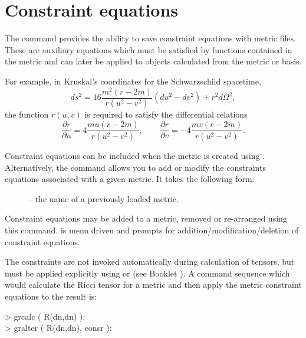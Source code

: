 \documentclass{article}
\begin{document}
\section{Constraint equations} \label{sec:constraint}
%
The  command provides the ability to save constraint equations
with metric files. These are auxiliary equations which must be satisfied
by functions contained in the metric and can later be applied to objects
calculated from the metric or basis.

For example, in Kruskal's coordinates for the Schwarzschild spacetime,
\[
  ds^2 = 16 \frac{m^2(r-2m)}{r(u^2-v^2)}(du^2 - dv^2) + r^2 d\Omega^2,
\]
the function $r(u,v)$ is required to satisfy the differential relations
\[
  \frac{\partial r}{\partial u} = 4 \frac{m u (r-2m)}{r(u^2 - v^2)}, 
    \qquad
  \frac{\partial r}{\partial v} = -4\frac{m v (r-2m)}{r(u^2 - v^2)}.
\]

Constraint equations can be included when the metric is created using
. Alternatively, the command  allows you
to add or modify the constraints equations associated with a given metric.
It takes the following form:\\
%
\begin{cmdspec}
  \label{spec:grconstraint}

  \begin{description}
    \item[] -- the name of a previously loaded metric.
  \end{description}

\end{cmdspec}

Constraint equations may be added to a metric, removed or re-arranged 
using this command.  is menu driven and prompts for 
addition/modification/deletion of constraint equations.

The constraints are not invoked
automatically during calculation of tensors, but must be applied explicitly
using  or  (see Booklet \grCalcRef). A
command sequence which would calculate the Ricci tensor for a metric and
then apply the metric constraint equations to the result is:\\

\begin{ttfamily}
  \noindent > grcalc ( R(dn,dn) ):\\
  > gralter ( R(dn,dn), consr ):\\
\end{ttfamily}
\end{document}
